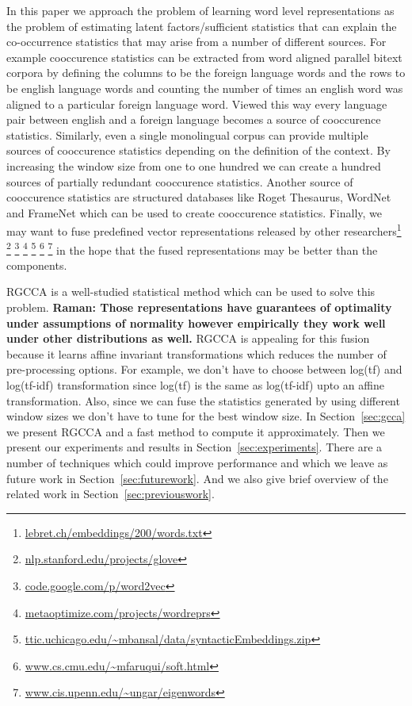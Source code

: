 \documentclass[11pt]{article}
\begin{document}
In this paper we approach the problem of learning word level representations as the
problem of estimating latent factors/sufficient statistics that can explain the
co-occurrence statistics that may arise from a number of different
sources. For example cooccurence statistics can be extracted from
word aligned parallel bitext corpora by defining the columns to be the
foreign language words and the rows to be english language words and
counting the number of times an english word was aligned to a
particular foreign language word. Viewed this way every language pair between english
and a foreign language becomes a source of cooccurence
statistics. Similarly, even a single monolingual corpus can provide multiple sources of
cooccurence statistics depending on the definition of the
context. By increasing the window size from one to one hundred we can
create a hundred sources of partially redundant cooccurence statistics. Another source of
cooccurence statistics are structured databases like Roget Thesaurus,
WordNet and FrameNet which can be used to create cooccurence
statistics. Finally, we may want to fuse predefined vector
representations released by other
researchers\footnote{\url{lebret.ch/embeddings/200/words.txt}}
  \footnote{\url{nlp.stanford.edu/projects/glove}}
  \footnote{\url{code.google.com/p/word2vec}}
  \footnote{\url{metaoptimize.com/projects/wordreprs}}
  \footnote{\url{ttic.uchicago.edu/~mbansal/data/syntacticEmbeddings.zip}}
  \footnote{\url{www.cs.cmu.edu/~mfaruqui/soft.html}}
  \footnote{\url{www.cis.upenn.edu/~ungar/eigenwords}}
  in the hope that the fused representations may be better
than the components.

RGCCA is a well-studied statistical method which
can be used to solve this problem. \textbf{Raman: Those representations have
guarantees of optimality under assumptions of normality however
empirically they work well under other distributions as well.}
RGCCA is appealing for this fusion because it
learns affine invariant transformations which reduces the number of
pre-processing options. For example, we don't have to choose 
between log(tf) and log(tf-idf) transformation since log(tf) is the
same as log(tf-idf) upto an affine transformation. Also, since we can
fuse the statistics generated by using different window sizes we don't
have to tune for the best window size.
In Section~\ref{sec:gcca} we present RGCCA and a fast method to
compute it approximately. 
Then we present our experiments and results in
Section~\ref{sec:experiments}.
There are a number of techniques which could improve performance and
which we leave as future work in Section~\ref{sec:futurework}. And we
also give brief overview of the related work in Section~\ref{sec:previouswork}.
\end{document}
